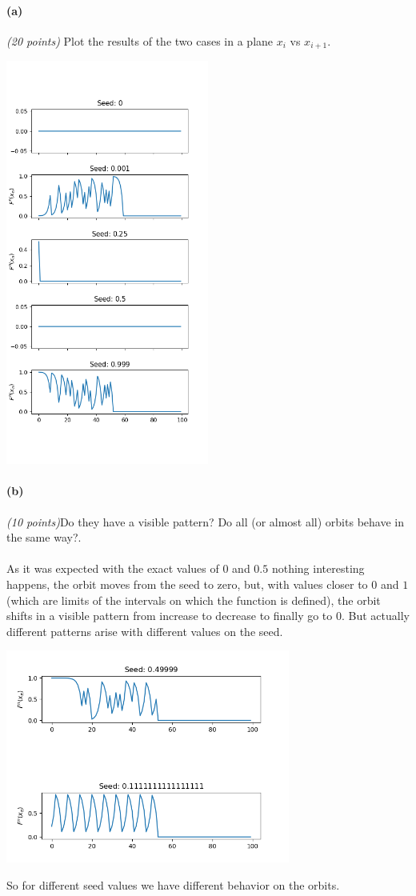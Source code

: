 \documentclass{article}
\begin{document}
\paragraph{(a)}\textit{(20 points)} Plot the results of the two cases in a plane $x_i$ vs $x_{i+1}$.
\begin{center}
	\includegraphics[width=0.5\textwidth]{plots_v2}
\end{center}
\paragraph{(b)}\textit{(10 points)}Do they have a visible pattern? Do all (or almost all) orbits behave in the same way?.
\paragraph{} As it was expected with the exact values of $0$ and $0.5$ nothing interesting happens, the orbit moves from the seed to zero, but, with values closer to $0$ and $1$ (which are limits of the intervals on which the function is defined), the orbit shifts in a visible pattern from increase to decrease to finally go to $0$. But actually different patterns arise with different values on the seed.
\begin{center}
	\includegraphics[width=0.7\textwidth]{plot_2.png}
\end{center}
So for different seed values we have different behavior on the orbits.
\newpage
\end{document}
